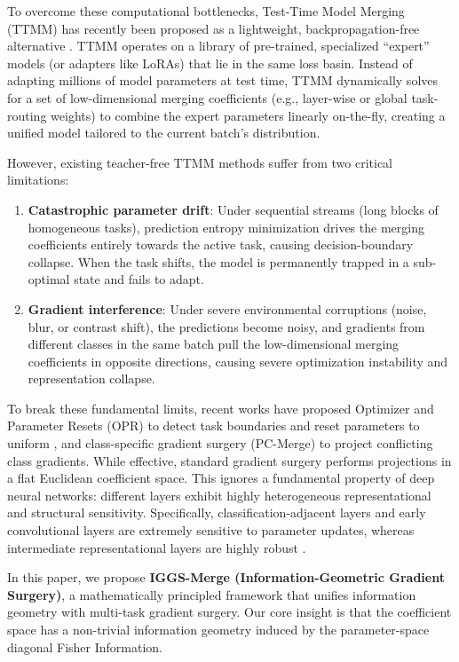 \documentclass{article}
\theoremstyle{plain}
\theoremstyle{definition}
\theoremstyle{remark}
\begin{document}
To overcome these computational bottlenecks, Test-Time Model Merging (TTMM) has recently been proposed as a lightweight, backpropagation-free alternative \cite{yang2024adamerging, anonymous2026s2c}. TTMM operates on a library of pre-trained, specialized ``expert'' models (or adapters like LoRAs) that lie in the same loss basin. Instead of adapting millions of model parameters at test time, TTMM dynamically solves for a set of low-dimensional merging coefficients (e.g., layer-wise or global task-routing weights) to combine the expert parameters linearly on-the-fly, creating a unified model tailored to the current batch's distribution.

However, existing teacher-free TTMM methods suffer from two critical limitations:
\begin{enumerate}
    \item \textbf{Catastrophic parameter drift}: Under sequential streams (long blocks of homogeneous tasks), prediction entropy minimization drives the merging coefficients entirely towards the active task, causing decision-boundary collapse. When the task shifts, the model is permanently trapped in a sub-optimal state and fails to adapt.
    \item \textbf{Gradient interference}: Under severe environmental corruptions (noise, blur, or contrast shift), the predictions become noisy, and gradients from different classes in the same batch pull the low-dimensional merging coefficients in opposite directions, causing severe optimization instability and representation collapse.
\end{enumerate}

To break these fundamental limits, recent works have proposed Optimizer and Parameter Resets (OPR) to detect task boundaries and reset parameters to uniform \cite{anonymous2026pc}, and class-specific gradient surgery (PC-Merge) to project conflicting class gradients. While effective, standard gradient surgery performs projections in a flat Euclidean coefficient space. This ignores a fundamental property of deep neural networks: different layers exhibit highly heterogeneous representational and structural sensitivity. Specifically, classification-adjacent layers and early convolutional layers are extremely sensitive to parameter updates, whereas intermediate representational layers are highly robust \cite{anonymous2026lfwa}.

In this paper, we propose \textbf{IGGS-Merge (Information-Geometric Gradient Surgery)}, a mathematically principled framework that unifies information geometry with multi-task gradient surgery. Our core insight is that the coefficient space has a non-trivial information geometry induced by the parameter-space diagonal Fisher Information. 
\end{document}
